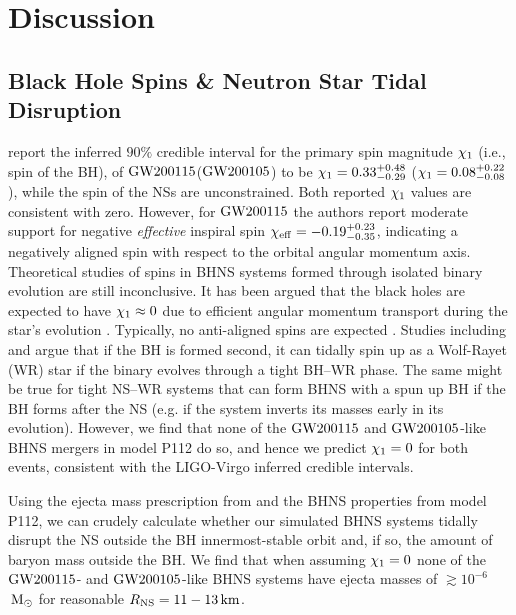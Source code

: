 \documentclass{aastex63}
\newcommand{\km}{\ensuremath{\,\rm{km}}\xspace}
\newcommand{\Msun}{\ensuremath{\,\rm{M}_{\odot}}\xspace}
\newcommand{\chibh}{\ensuremath{{\chi}_{\rm{1}}}\xspace}
\newcommand{\Rns}{\ensuremath{{R}_{\rm{NS}}}\xspace}
\newcommand{\gwone}{\ensuremath{\rm{GW200115}}\xspace}
\newcommand{\gwzero}{\ensuremath{\rm{GW200105}}\xspace}
\newcommand{\model}{P112\xspace}
\begin{document}

\section{Discussion}
\label{sec:discussion}
%
%

\subsection{Black Hole Spins \& Neutron Star Tidal Disruption}
%

\citet{Abbott:2021-first-NSBH} report the inferred $90\%$ credible interval for the primary spin magnitude $\chibh$  (i.e., spin of the \ac{BH}), of \gwone (\gwzero) to be  $\chibh = 0.33_{-0.29}^{+0.48}$  ($\chibh = 0.08_{-0.08}^{+0.22}$), while the spin of the \acp{NS} are unconstrained. Both reported \chibh values are consistent with zero. However,  for \gwone the authors report moderate support for negative \textit{effective} inspiral spin $\chi_{\rm{eff}} = -0.19_{-0.35}^{+0.23}$,
indicating a negatively aligned spin with respect to the orbital angular momentum axis. Theoretical studies of spins in \ac{BHNS} systems formed  through isolated binary evolution are still inconclusive. It has been argued that the black holes are expected to have $\chibh \approx 0$ due to  efficient angular momentum transport during the star's evolution  \citep[e.g.][]{FragosMcClintock:2015,FullerMa:2019}. Typically, no anti-aligned spins are expected \citep[but see e.g., the discussion in ][]{Wysocki:2017}.  Studies including \citet[][]{Qin:2018} and \citet{Bavera:2020} argue that if the \ac{BH} is formed second, it can tidally spin up as a Wolf-Rayet (WR) star if the binary evolves through a tight \ac{BH}--WR phase. The same might be true for tight \ac{NS}--WR systems that can form \ac{BHNS} with a spun up \ac{BH} if the \ac{BH} forms after the \ac{NS} (e.g. if the system inverts its masses early in its evolution).  However, we find that none of the \gwone and \gwzero-like \ac{BHNS} mergers in model \model do so, and hence  we predict $\chibh = 0$ for both events, consistent with the LIGO-Virgo inferred credible intervals.

Using the ejecta mass prescription from   \citet[][Equation~4]{Foucart:2018} and the \ac{BHNS} properties from model \model, we can crudely calculate whether our simulated \ac{BHNS} systems tidally disrupt the \ac{NS} outside the \ac{BH} innermost-stable orbit and, if so, the amount of baryon mass outside the \ac{BH}. We find that when assuming $\chibh=0$ none of the \gwone- and \gwzero-like \ac{BHNS} systems have ejecta masses of $\gtrsim 10^{-6}$\Msun \citep[cf.][]{Abbott:2021-first-NSBH, Zhu:2021} for reasonable $\Rns = 11-13\km$.
\end{document}
